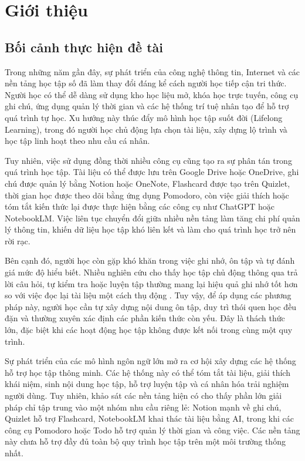 \chapter{Giới thiệu}
\label{Chapter1}


\section{Bối cảnh thực hiện đề tài}

Trong những năm gần đây, sự phát triển của công nghệ thông tin, Internet và các nền tảng học tập số đã làm thay đổi đáng kể cách người học tiếp cận tri thức. Người học có thể dễ dàng sử dụng kho học liệu mở, khóa học trực tuyến, công cụ ghi chú, ứng dụng quản lý thời gian và các hệ thống trí tuệ nhân tạo để hỗ trợ quá trình tự học. Xu hướng này thúc đẩy mô hình học tập suốt đời (Lifelong Learning), trong đó người học chủ động lựa chọn tài liệu, xây dựng lộ trình và học tập linh hoạt theo nhu cầu cá nhân.

Tuy nhiên, việc sử dụng đồng thời nhiều công cụ cũng tạo ra sự phân tán trong quá trình học tập. Tài liệu có thể được lưu trên Google Drive hoặc OneDrive, ghi chú được quản lý bằng Notion hoặc OneNote, Flashcard được tạo trên Quizlet, thời gian học được theo dõi bằng ứng dụng Pomodoro, còn việc giải thích hoặc tóm tắt kiến thức lại được thực hiện bằng các công cụ như ChatGPT hoặc NotebookLM. Việc liên tục chuyển đổi giữa nhiều nền tảng làm tăng chi phí quản lý thông tin, khiến dữ liệu học tập khó liên kết và làm cho quá trình học trở nên rời rạc.

Bên cạnh đó, người học còn gặp khó khăn trong việc ghi nhớ, ôn tập và tự đánh giá mức độ hiểu biết. Nhiều nghiên cứu cho thấy học tập chủ động thông qua trả lời câu hỏi, tự kiểm tra hoặc luyện tập thường mang lại hiệu quả ghi nhớ tốt hơn so với việc đọc lại tài liệu một cách thụ động \cite{roediger2006testenhanced,dunlosky2013effectivelearning}. Tuy vậy, để áp dụng các phương pháp này, người học cần tự xây dựng nội dung ôn tập, duy trì thói quen học đều đặn và thường xuyên xác định các phần kiến thức còn yếu. Đây là thách thức lớn, đặc biệt khi các hoạt động học tập không được kết nối trong cùng một quy trình.

Sự phát triển của các mô hình ngôn ngữ lớn mở ra cơ hội xây dựng các hệ thống hỗ trợ học tập thông minh. Các hệ thống này có thể tóm tắt tài liệu, giải thích khái niệm, sinh nội dung học tập, hỗ trợ luyện tập và cá nhân hóa trải nghiệm người dùng. Tuy nhiên, khảo sát các nền tảng hiện có cho thấy phần lớn giải pháp chỉ tập trung vào một nhóm nhu cầu riêng lẻ: Notion mạnh về ghi chú, Quizlet hỗ trợ Flashcard, NotebookLM khai thác tài liệu bằng AI, trong khi các công cụ Pomodoro hoặc Todo hỗ trợ quản lý thời gian và công việc. Các nền tảng này chưa hỗ trợ đầy đủ toàn bộ quy trình học tập trên một môi trường thống nhất.

